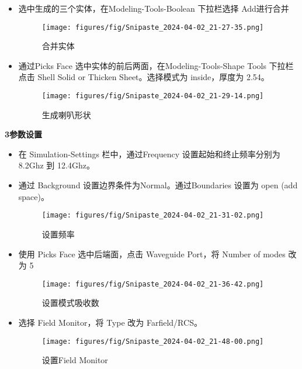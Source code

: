 \documentclass[12pt,hyperref,a4paper,UTF8]{ctexart}
\begin{document}
\begin{itemize}
\begin{figure}[H]
    \end{figure}
    \item 选中生成的三个实体，在Modeling-Tools-Boolean 下拉栏选择 Add进行合并
    \begin{figure}[H]
        \centering
        \texttt{[image: figures/fig/Snipaste\_2024-04-02\_21-27-35.png]}
        \caption{合并实体}
        \label{fig:enter-label}
    \end{figure}
    \item 通过Picks Face 选中实体的前后两面，在Modeling-Tools-Shape Tools 下拉栏点击 Shell Solid
    or Thicken Sheet。选择模式为 inside，厚度为 2.54。
    \begin{figure}[H]
        \centering
        \texttt{[image: figures/fig/Snipaste\_2024-04-02\_21-29-14.png]}
        \caption{生成喇叭形状}
        \label{fig:enter-label}
    \end{figure}
\end{itemize}

\textbf{3参数设置}
\begin{itemize}
    \item 在 Simulation-Settings 栏中，通过Frequency 设置起始和终止频率分别为 8.2Ghz 到 12.4Ghz。
    \item 通过 Background 设置边界条件为Normal。通过Boundaries 设置为 open (add space)。
    \begin{figure}[H]
        \centering
        \texttt{[image: figures/fig/Snipaste\_2024-04-02\_21-31-02.png]}
        \caption{设置频率}
        \label{fig:enter-label}
    \end{figure}
    \item 使用 Picks Face 选中后端面，点击 Waveguide Port，将 Number of modes 改为 5
    \begin{figure}[H]
        \centering
        \texttt{[image: figures/fig/Snipaste\_2024-04-02\_21-36-42.png]}
        \caption{设置模式吸收数}
        \label{fig:enter-label}
    \end{figure}
    \item 选择 Field Monitor，将 Type 改为 Farfield/RCS。
    \begin{figure}[H]
        \centering
        \texttt{[image: figures/fig/Snipaste\_2024-04-02\_21-48-00.png]}
        \caption{设置Field Monitor}
        \label{fig:enter-label}
    \end{figure}
\end{itemize}
\end{document}
